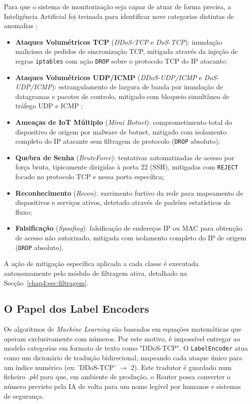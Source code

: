 Para que o sistema de monitorização seja capaz de atuar de forma precisa,
a Inteligência Artificial foi treinada para identificar nove categorias
distintas de anomalias :

\begin{itemize}
    \item \textbf{Ataques Volumétricos TCP} (\textit{DDoS-TCP} e
    \textit{DoS-TCP}): inundação maliciosa de pedidos de sincronização
    TCP, mitigada através da injeção de regras \texttt{iptables} com
    ação \texttt{DROP} sobre o protocolo TCP do IP atacante;

    \item \textbf{Ataques Volumétricos UDP/ICMP} (\textit{DDoS-UDP/ICMP}
    e \textit{DoS-UDP/ICMP}): estrangulamento de largura de banda por
    inundação de datagramas e pacotes de controlo, mitigado com bloqueio
    simultâneo de tráfego UDP e ICMP ;

    \item \textbf{Ameaças de IoT Múltiplo} (\textit{Mirai Botnet}):
    comprometimento total do dispositivo de origem por malware de botnet,
    mitigado com isolamento completo do IP atacante sem filtragem de
    protocolo (\texttt{DROP} absoluto);

    \item \textbf{Quebra de Senha} (\textit{BruteForce}): tentativas
    automatizadas de acesso por força bruta, tipicamente dirigidas à
    porta 22 (SSH), mitigadas com \texttt{REJECT} focado no protocolo
    TCP e nessa porta específica;

    \item \textbf{Reconhecimento} (\textit{Recon}): varrimento furtivo
    da rede para mapeamento de dispositivos e serviços ativos, detetado
    através de padrões estatísticos de fluxo;

    \item \textbf{Falsificação} (\textit{Spoofing}): falsificação de
    endereços IP ou MAC para obtenção de acesso não autorizado, mitigada
    com isolamento completo do IP de origem (\texttt{DROP} absoluto).
\end{itemize}

A ação de mitigação específica aplicada a cada classe é executada
autonomamente pelo módulo de filtragem ativa, detalhado na
Secção~\ref{chap4:sec:filtragem}.

\subsection{O Papel dos Label Encoders}
Os algoritmos de \textit{Machine Learning} são baseados em equações matemáticas que operam exclusivamente com números. Por este motivo, é impossível entregar ao modelo categorias em formato de texto como "\ac{DDoS}-\ac{TCP}". O \texttt{LabelEncoder} atua como um dicionário de tradução bidirecional, mapeando cada ataque único para um índice numérico (ex: 'DDoS-TCP' $\rightarrow$ 2). Este tradutor é guardado num ficheiro \textit{.pkl} para que, em ambiente de produção, o Router possa converter o número previsto pela IA de volta para um nome legível por humanos e sistemas de segurança.

